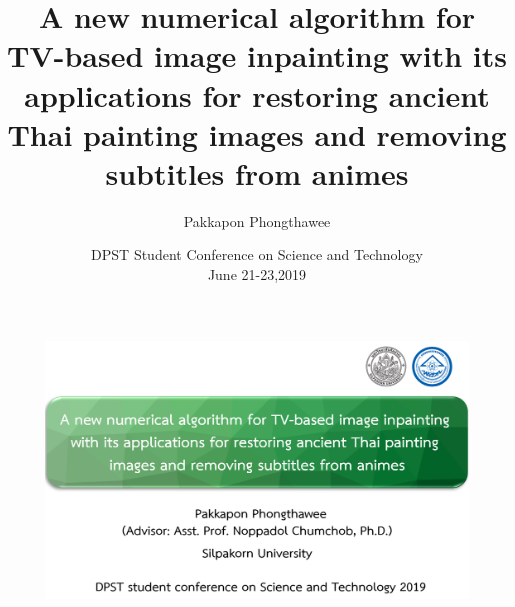 \documentclass[xcolor=dvipsnames, xetex,serif]{beamer}
\title[numerical algorithm for image inpainting]{A new numerical algorithm for TV-based image inpainting with its applications for restoring ancient Thai painting images and removing subtitles from animes}
\author[Pakkapon]{Pakkapon Phongthawee}
\institute[Silpakorn]{
 	Department of Mathematics\\
 	Silpakorn University \\}
\date[DPSTCON 2019]{DPST Student Conference on Science and Technology\\June 21-23,2019}
\begin{document}
    \begin{frame}
        \begin{figure}[H]
            \centering
            \includegraphics[width=1\linewidth]{images/cover.png}
        \end{figure}
    \end{frame}
\end{document}
